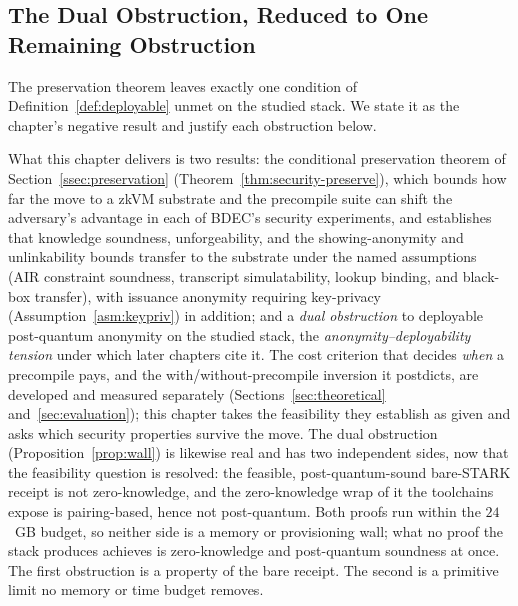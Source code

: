 \subsection{The Dual Obstruction, Reduced to One Remaining Obstruction}\label{ssec:zk-gap}
The preservation theorem leaves exactly one condition of Definition~\ref{def:deployable} unmet on the studied stack. We state it as the chapter's negative result and justify each obstruction below.

What this chapter delivers is two results: the conditional preservation theorem of Section~\ref{ssec:preservation} (Theorem~\ref{thm:security-preserve}), which bounds how far the move to a zkVM substrate and the precompile suite can shift the adversary's advantage in each of BDEC's security experiments, and establishes that knowledge soundness, unforgeability, and the showing-anonymity and unlinkability bounds transfer to the substrate under the named assumptions (AIR constraint soundness, transcript simulatability, lookup binding, and black-box transfer), with issuance anonymity requiring key-privacy (Assumption~\ref{asm:keypriv}) in addition; and a \emph{dual obstruction} to deployable post-quantum anonymity on the studied stack, the \emph{anonymity--deployability tension} under which later chapters cite it. The cost criterion that decides \emph{when} a precompile pays, and the with/without-precompile inversion it postdicts, are developed and measured separately (Sections~\ref{sec:theoretical} and~\ref{sec:evaluation}); this chapter takes the feasibility they establish as given and asks which security properties survive the move. The dual obstruction (Proposition~\ref{prop:wall}) is likewise real and has two independent sides, now that the feasibility question is resolved: the feasible, post-quantum-sound bare-STARK receipt is not zero-knowledge, and the zero-knowledge wrap of it the toolchains expose is pairing-based, hence not post-quantum. Both proofs run within the $24$~GB budget, so neither side is a memory or provisioning wall; what no proof the stack produces achieves is zero-knowledge and post-quantum soundness at once. The first obstruction is a property of the bare receipt. The second is a primitive limit no memory or time budget removes.

